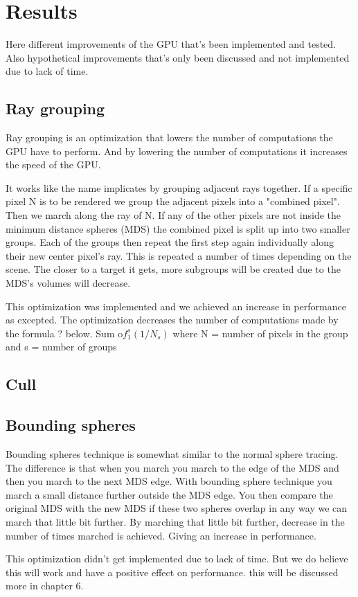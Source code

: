 \chapter{Results}

	Here different improvements of the GPU that's been implemented and tested.
	Also hypothetical improvements that's only been discussed and not
	implemented due to lack of time.  

	\section{Ray grouping}
	
		Ray grouping is an optimization that lowers the number of computations
		the GPU have to perform. And by lowering the number of computations it
		increases the speed of the GPU.
		
		It works like the name implicates by grouping adjacent rays together.
		If a specific pixel N is to be rendered we group the adjacent pixels
		into a "combined pixel". Then we march along the ray of N. If any of
		the other pixels are not inside the minimum distance spheres (MDS) the
		combined pixel is split up into two smaller groups. Each of the groups
		then repeat the first step again individually along their new center
		pixel's ray. This is repeated a number of times depending on the scene.
		The closer to a target it gets, more subgroups will be created due to
		the MDS's volumes will decrease.
		
		This optimization was implemented and we achieved an increase in
		performance as excepted. The optimization decreases the number of
		computations made by the formula ? below.  Sum o$f_1^s(1/N_s)$ where N
		= number of pixels in the group and s = number of groups
	
	
	\section{Cull}
	
	\section{Bounding spheres}

		Bounding spheres technique is somewhat similar to the normal sphere
		tracing. The difference is that when you march you march to the edge of
		the MDS and then you march to the next MDS edge. With bounding sphere
		technique you march a small distance further outside the MDS edge. You
		then compare the original MDS with the new MDS if these two spheres
		overlap in any way we can march that little bit further. By marching
		that little bit further, decrease in the number of times marched is
		achieved. Giving an increase in performance. 
		
		This optimization didn't get implemented due to lack of time. But we do
		believe this will work and have a positive effect on performance. this
		will be discussed more in chapter 6.
	
